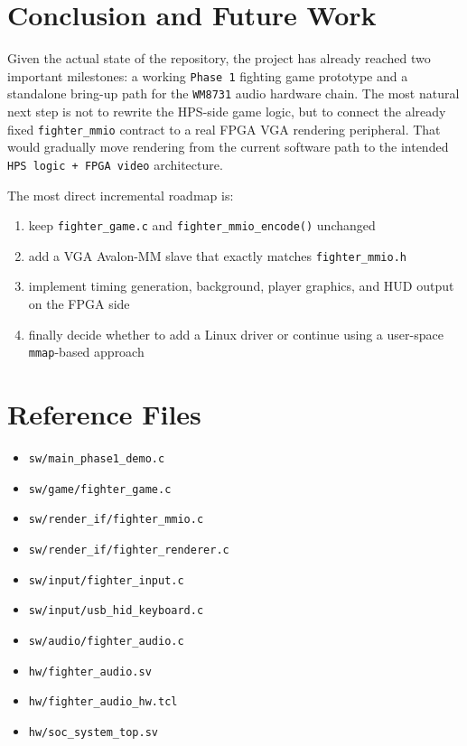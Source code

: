 \documentclass[12pt,a4paper]{article}
\begin{document}
\section{Conclusion and Future Work}

Given the actual state of the repository, the project has already reached two important milestones: a working \texttt{Phase 1} fighting game prototype and a standalone bring-up path for the \texttt{WM8731} audio hardware chain. The most natural next step is not to rewrite the HPS-side game logic, but to connect the already fixed \texttt{fighter\_mmio} contract to a real FPGA VGA rendering peripheral. That would gradually move rendering from the current software path to the intended \texttt{HPS logic + FPGA video} architecture.

The most direct incremental roadmap is:

\begin{enumerate}
  \item keep \texttt{fighter\_game.c} and \texttt{fighter\_mmio\_encode()} unchanged
  \item add a VGA Avalon-MM slave that exactly matches \texttt{fighter\_mmio.h}
  \item implement timing generation, background, player graphics, and HUD output on the FPGA side
  \item finally decide whether to add a Linux driver or continue using a user-space \texttt{mmap}-based approach
\end{enumerate}

\section{Reference Files}

\begin{itemize}
  \item \texttt{sw/main\_phase1\_demo.c}
  \item \texttt{sw/game/fighter\_game.c}
  \item \texttt{sw/render\_if/fighter\_mmio.c}
  \item \texttt{sw/render\_if/fighter\_renderer.c}
  \item \texttt{sw/input/fighter\_input.c}
  \item \texttt{sw/input/usb\_hid\_keyboard.c}
  \item \texttt{sw/audio/fighter\_audio.c}
  \item \texttt{hw/fighter\_audio.sv}
  \item \texttt{hw/fighter\_audio\_hw.tcl}
  \item \texttt{hw/soc\_system\_top.sv}
\end{itemize}
\end{document}
